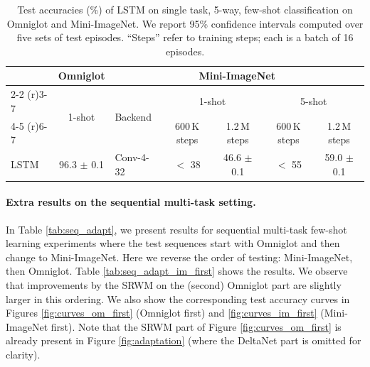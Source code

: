 \documentclass[nohyperref]{article}
\theoremstyle{plain}
\theoremstyle{definition}
\theoremstyle{remark}
\begin{document}
\begin{table}[h]
\caption{Test accuracies (\%) of LSTM on single task, 5-way, few-shot classification on Omniglot and Mini-ImageNet.
We report 95\% confidence intervals computed over five sets of test episodes.
``Steps'' refer to training steps; each is a batch of 16 episodes.
}
\label{tab:few_shot_lstm}
\vskip 0.15in
\begin{center}
\begin{tabular}{lclcccc}
\toprule
       &   Omniglot  & \multicolumn{5}{c}{Mini-ImageNet} \\ \cmidrule(r){2-2} \cmidrule(r){3-7} 
        & \multirow{2}{*}{1-shot} & \multirow{ 2}{*}{Backend} & \multicolumn{2}{c}{1-shot} & \multicolumn{2}{c}{5-shot}  \\ \cmidrule(r){4-5} \cmidrule(r){6-7}
   &  &  & 600\,K steps & 1.2\,M steps  & 600\,K steps & 1.2\,M steps \\ \midrule
LSTM   &   96.3  $\pm$ 0.1  & Conv-4-32 & $<$ 38 & 46.6 $\pm$ 0.1 & $<$ 55 & 59.0 $\pm$ 0.1 \\
\bottomrule
\end{tabular}
\end{center}
\vskip -0.1in
\end{table}

\paragraph{Extra results on the sequential multi-task setting.}

In Table \ref{tab:seq_adapt}, we present results for sequential multi-task few-shot learning experiments where the test sequences start with Omniglot and then change to Mini-ImageNet.
Here we reverse the order of testing: Mini-ImageNet, then Omniglot.
Table \ref{tab:seq_adapt_im_first} shows the results.
We observe that improvements by the SRWM on the (second) Omniglot part are slightly larger in this ordering.
We also show the corresponding test accuracy curves in
Figures \ref{fig:curves_om_first} (Omniglot first) and \ref{fig:curves_im_first} (Mini-ImageNet first).
Note that the SRWM part of Figure \ref{fig:curves_om_first}
is already present in Figure \ref{fig:adaptation} (where the DeltaNet part is omitted for clarity).
\end{document}
